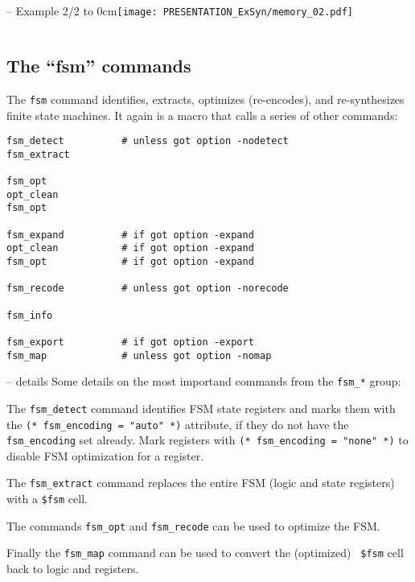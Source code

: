 \begin{frame}[t, fragile]{\subsecname{} -- Example 2/2}
\vbox to 0cm{\hfill\texttt{[image: PRESENTATION\_ExSyn/memory\_02.pdf]}\vss}
\vskip-1cm
\begin{columns}
\column[t]{5cm}

\column[t]{5cm}

\end{columns}
\end{frame}


\subsection{The ``fsm'' commands}

\begin{frame}[fragile]{\subsecname{}}
The {\tt fsm} command identifies, extracts, optimizes (re-encodes), and
re-synthesizes finite state machines. It again is a macro that calls
a series of other commands:

\begin{lstlisting}[xleftmargin=0.5cm, basicstyle=\ttfamily\fontsize{8pt}{10pt}\selectfont]
fsm_detect          # unless got option -nodetect
fsm_extract

fsm_opt
opt_clean
fsm_opt

fsm_expand          # if got option -expand
opt_clean           # if got option -expand
fsm_opt             # if got option -expand

fsm_recode          # unless got option -norecode

fsm_info

fsm_export          # if got option -export
fsm_map             # unless got option -nomap
\end{lstlisting}
\end{frame}

\begin{frame}{\subsecname{} -- details}
Some details on the most importand commands from the {\tt fsm\_*} group:

\bigskip
The {\tt fsm\_detect} command identifies FSM state registers and marks them
with the {\tt (* fsm\_encoding = "auto" *)} attribute, if they do not have the
{\tt fsm\_encoding} set already. Mark registers with {\tt (* fsm\_encoding =
"none" *)} to disable FSM optimization for a register.

\bigskip
The {\tt fsm\_extract} command replaces the entire FSM (logic and state
registers) with a {\tt \$fsm} cell.

\bigskip
The commands {\tt fsm\_opt} and {\tt fsm\_recode} can be used to optimize the
FSM.

\bigskip
Finally the {\tt fsm\_map} command can be used to convert the (optimized) {\tt
\$fsm} cell back to logic and registers.
\end{frame}

